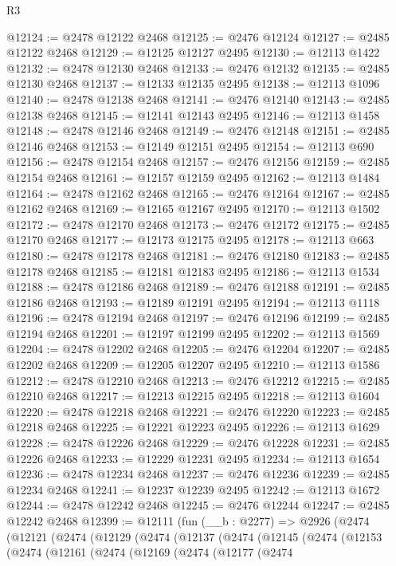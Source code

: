 \begin{lexlean}{R3}
\begin{coremodule}
@12124 := @2478 @12122 @2468
@12125 := @2476 @12124
@12127 := @2485 @12122 @2468
@12129 := @12125 @12127 @2495
@12130 := @12113 @1422
@12132 := @2478 @12130 @2468
@12133 := @2476 @12132
@12135 := @2485 @12130 @2468
@12137 := @12133 @12135 @2495
@12138 := @12113 @1096
@12140 := @2478 @12138 @2468
@12141 := @2476 @12140
@12143 := @2485 @12138 @2468
@12145 := @12141 @12143 @2495
@12146 := @12113 @1458
@12148 := @2478 @12146 @2468
@12149 := @2476 @12148
@12151 := @2485 @12146 @2468
@12153 := @12149 @12151 @2495
@12154 := @12113 @690
@12156 := @2478 @12154 @2468
@12157 := @2476 @12156
@12159 := @2485 @12154 @2468
@12161 := @12157 @12159 @2495
@12162 := @12113 @1484
@12164 := @2478 @12162 @2468
@12165 := @2476 @12164
@12167 := @2485 @12162 @2468
@12169 := @12165 @12167 @2495
@12170 := @12113 @1502
@12172 := @2478 @12170 @2468
@12173 := @2476 @12172
@12175 := @2485 @12170 @2468
@12177 := @12173 @12175 @2495
@12178 := @12113 @663
@12180 := @2478 @12178 @2468
@12181 := @2476 @12180
@12183 := @2485 @12178 @2468
@12185 := @12181 @12183 @2495
@12186 := @12113 @1534
@12188 := @2478 @12186 @2468
@12189 := @2476 @12188
@12191 := @2485 @12186 @2468
@12193 := @12189 @12191 @2495
@12194 := @12113 @1118
@12196 := @2478 @12194 @2468
@12197 := @2476 @12196
@12199 := @2485 @12194 @2468
@12201 := @12197 @12199 @2495
@12202 := @12113 @1569
@12204 := @2478 @12202 @2468
@12205 := @2476 @12204
@12207 := @2485 @12202 @2468
@12209 := @12205 @12207 @2495
@12210 := @12113 @1586
@12212 := @2478 @12210 @2468
@12213 := @2476 @12212
@12215 := @2485 @12210 @2468
@12217 := @12213 @12215 @2495
@12218 := @12113 @1604
@12220 := @2478 @12218 @2468
@12221 := @2476 @12220
@12223 := @2485 @12218 @2468
@12225 := @12221 @12223 @2495
@12226 := @12113 @1629
@12228 := @2478 @12226 @2468
@12229 := @2476 @12228
@12231 := @2485 @12226 @2468
@12233 := @12229 @12231 @2495
@12234 := @12113 @1654
@12236 := @2478 @12234 @2468
@12237 := @2476 @12236
@12239 := @2485 @12234 @2468
@12241 := @12237 @12239 @2495
@12242 := @12113 @1672
@12244 := @2478 @12242 @2468
@12245 := @2476 @12244
@12247 := @2485 @12242 @2468
@12399 := @12111
    (fun (__b : @2277) =>
    @2926
      (@2474
        (@12121
          (@2474
            (@12129
              (@2474
                (@12137
                  (@2474
                    (@12145
                      (@2474
                        (@12153
                          (@2474
                            (@12161
                              (@2474
                                (@12169
                                  (@2474
                                    (@12177
                                      (@2474

\end{coremodule}
\end{lexlean}

